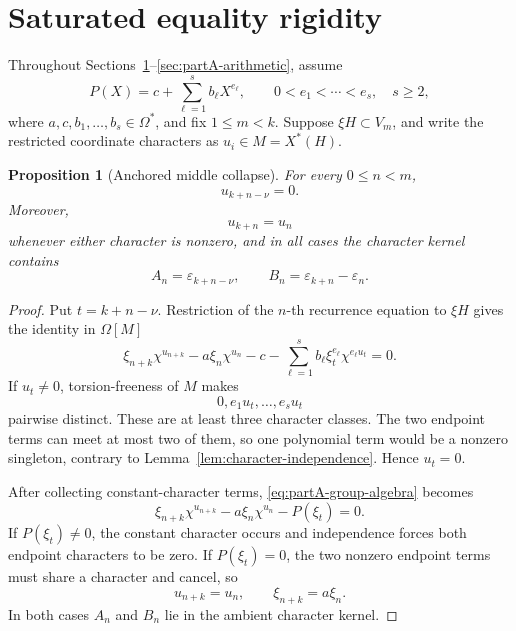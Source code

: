 \documentclass[11pt]{article}
\newcommand{\Om}{\Omega}
\newcommand{\eps}{\varepsilon}
\newtheorem{proposition}[lemma]{Proposition}
\theoremstyle{remark}
\numberwithin{equation}{section}
\begin{document}
\section{Saturated equality rigidity}\label{sec:rigidity}

Throughout Sections~\ref{sec:rigidity}--\ref{sec:partA-arithmetic}, assume
\begin{equation}\label{eq:partA-polynomial}
 P(X)=c+\sum_{\ell=1}^{s}b_\ell X^{e_\ell},
 \qquad 0<e_1<\cdots<e_s,\quad s\geq2,
\end{equation}
where \(a,c,b_1,\ldots,b_s\in\Om^\ast\), and fix \(1\leq m<k\).  Suppose \(\xi H\subset V_m\), and write the restricted coordinate characters as \(u_i\in M=X^\ast(H)\).

\begin{proposition}[Anchored middle collapse]\label{prop:middle-collapse}
For every \(0\leq n<m\),
\[
 u_{k+n-\nu}=0.
\]
Moreover,
\[
 u_{k+n}=u_n
\]
whenever either character is nonzero, and in all cases the character kernel contains
\[
 A_n=\eps_{k+n-\nu},
 \qquad B_n=\eps_{k+n}-\eps_n.
\]
\end{proposition}

\begin{proof}
Put \(t=k+n-\nu\).  Restriction of the \(n\)-th recurrence equation to \(\xi H\) gives the identity in \(\Om[M]\)
\begin{equation}\label{eq:partA-group-algebra}
 \xi_{n+k}\chi^{u_{n+k}}
 -a\xi_n\chi^{u_n}
 -c-\sum_{\ell=1}^{s}b_\ell\xi_t^{e_\ell}
       \chi^{e_\ell u_t}=0.
\end{equation}
If \(u_t\neq0\), torsion-freeness of \(M\) makes
\[
 0,e_1u_t,\ldots,e_su_t
\]
pairwise distinct.  These are at least three character classes.  The two endpoint terms can meet at most two of them, so one polynomial term would be a nonzero singleton, contrary to Lemma~\ref{lem:character-independence}.  Hence \(u_t=0\).

After collecting constant-character terms, \eqref{eq:partA-group-algebra} becomes
\begin{equation}\label{eq:partA-collected}
 \xi_{n+k}\chi^{u_{n+k}}
 -a\xi_n\chi^{u_n}-P(\xi_t)=0.
\end{equation}
If \(P(\xi_t)\neq0\), the constant character occurs and independence forces both endpoint characters to be zero.  If \(P(\xi_t)=0\), the two nonzero endpoint terms must share a character and cancel, so
\[
 u_{n+k}=u_n,\qquad \xi_{n+k}=a\xi_n.
\]
In both cases \(A_n\) and \(B_n\) lie in the ambient character kernel.
\end{proof}
\end{document}

